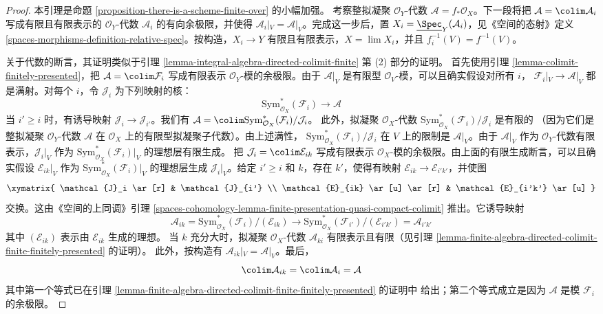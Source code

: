 \begin{proof}
本引理是命题 \ref{proposition-there-is-a-scheme-finite-over} 的小幅加强。
考察整拟凝聚 $\mathcal{O}_Y$-代数
$\mathcal{A} = f_*\mathcal{O}_X$。下一段将把
$\mathcal{A} = \colim \mathcal{A}_i$ 写成有限且有限表示的
$\mathcal{O}_Y$-代数 $\mathcal{A}_i$ 的有向余极限，并使得
$\mathcal{A}_i|_V = \mathcal{A}|_V$。完成这一步后，置
$X_i = \underline{\Spec}_Y(\mathcal{A}_i)$，见《空间的态射》定义
\ref{spaces-morphisms-definition-relative-spec}。按构造，$X_i \to Y$
有限且有限表示，$X = \lim X_i$，并且
$f_i^{-1}(V) = f^{-1}(V)$。

\medskip\noindent
关于代数的断言，其证明类似于引理
\ref{lemma-integral-algebra-directed-colimit-finite} 第 (2) 部分的证明。
首先使用引理 \ref{lemma-colimit-finitely-presented}，把
$\mathcal{A} = \colim \mathcal{F}_i$ 写成有限表示
$\mathcal{O}_Y$-模的余极限。由于 $\mathcal{A}|_V$ 是有限型
$\mathcal{O}_V$-模，可以且确实假设对所有 $i$，
$\mathcal{F}_i|_V \to \mathcal{A}|_V$ 都是满射。对每个 $i$，令
$\mathcal{J}_i$ 为下列映射的核：
$$
\text{Sym}^*_{\mathcal{O}_X}(\mathcal{F}_i) \longrightarrow \mathcal{A}
$$
当 $i' \geq i$ 时，有诱导映射
$\mathcal{J}_i \to \mathcal{J}_{i'}$。我们有
$\mathcal{A} =
\colim \text{Sym}^*_{\mathcal{O}_X}(\mathcal{F}_i)/\mathcal{J}_i$。
此外，拟凝聚 $\mathcal{O}_X$-代数
$\text{Sym}^*_{\mathcal{O}_X}(\mathcal{F}_i)/\mathcal{J}_i$ 是有限的
（因为它们是整拟凝聚 $\mathcal{O}_Y$-代数 $\mathcal{A}$ 在
$\mathcal{O}_X$ 上的有限型拟凝聚子代数）。由上述满性，
$\text{Sym}^*_{\mathcal{O}_X}(\mathcal{F}_i)/\mathcal{J}_i$ 在 $V$
上的限制是 $\mathcal{A}|_V$。由于 $\mathcal{A}|_V$ 作为
$\mathcal{O}_Y$-代数有限表示，$\mathcal{J}_i|_V$ 作为
$\text{Sym}^*_{\mathcal{O}_X}(\mathcal{F}_i)|_V$ 的理想层有限生成。
把 $\mathcal{J}_i = \colim \mathcal{E}_{ik}$ 写成有限表示
$\mathcal{O}_X$-模的余极限。由上面的有限生成断言，可以且确实假设
$\mathcal{E}_{ik}|_V$ 作为
$\text{Sym}^*_{\mathcal{O}_X}(\mathcal{F}_i)|_V$ 的理想层生成
$\mathcal{J}_i|_V$。给定 $i' \geq i$ 和 $k$，存在 $k'$，使得有映射
$\mathcal{E}_{ik} \to \mathcal{E}_{i'k'}$，并使图
$$
\xymatrix{
\mathcal{J}_i \ar[r] & \mathcal{J}_{i'} \\
\mathcal{E}_{ik} \ar[u] \ar[r] & \mathcal{E}_{i'k'} \ar[u]
}
$$
交换。这由《空间的上同调》引理
\ref{spaces-cohomology-lemma-finite-presentation-quasi-compact-colimit}
推出。它诱导映射
$$
\mathcal{A}_{ik} =
\text{Sym}^*_{\mathcal{O}_X}(\mathcal{F}_i)/(\mathcal{E}_{ik})
\longrightarrow
\text{Sym}^*_{\mathcal{O}_X}(\mathcal{F}_{i'})/(\mathcal{E}_{i'k'}) =
\mathcal{A}_{i'k'}
$$
其中 $(\mathcal{E}_{ik})$ 表示由 $\mathcal{E}_{ik}$ 生成的理想。
当 $k$ 充分大时，拟凝聚 $\mathcal{O}_X$-代数 $\mathcal{A}_{ki}$
有限表示且有限（见引理
\ref{lemma-finite-algebra-directed-colimit-finite-finitely-presented} 的证明）。
此外，按构造有 $\mathcal{A}_{ik}|_V = \mathcal{A}|_V$。最后，
$$
\colim \mathcal{A}_{ik} = \colim \mathcal{A}_i = \mathcal{A}
$$
其中第一个等式已在引理
\ref{lemma-finite-algebra-directed-colimit-finite-finitely-presented} 的证明中
给出；第二个等式成立是因为 $\mathcal{A}$ 是模 $\mathcal{F}_i$ 的余极限。
\end{proof}

